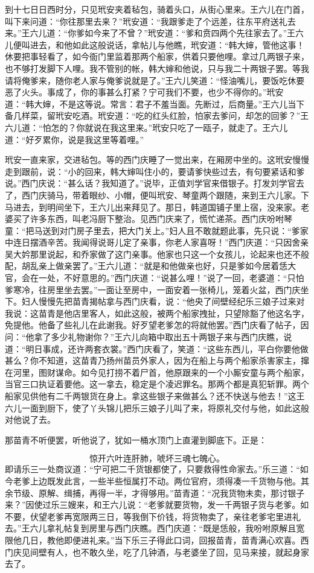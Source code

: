 到十七日日西时分，只见玳安夹着毡包，骑着头口，从街心里来。王六儿在门首，叫下来问道：“你往那里去来？”玳安道：“我跟爹走了个远差，往东平府送礼去来。”王六儿道：“你爹如今来了不曾？”玳安道：“爹和贲四两个先往家去了。”王六儿便叫进去，和他如此这般说话，拿帖儿与他瞧，玳安道：“韩大婶，管他这事！休要把事轻看了，如今衙门里监着那两个船家，供着只要他哩。拿过几两银子来，也不够打发脚下人哩。我不管别的帐，韩大婶和他说，只与我二十两银子罢。等我请将俺爹来，随你老人家与俺爹说就是了。”王六儿笑道：“怪油嘴儿，要饭吃休要恶了火头。事成了，你的事甚么打紧？宁可我们不要，也少不得你的。”玳安道：“韩大婶，不是这等说。常言：君子不羞当面。先断过，后商量。”王六儿当下备几样菜，留玳安吃酒。玳安道：“吃的红头红脸，怕家去爹问，却怎的回爹？”王六儿道：“怕怎的？你就说在我这里来。”玳安只吃了一瓯子，就走了。王六儿道：“好歹累你，说是我这里等着哩。”

玳安一直来家，交进毡包。等的西门庆睡了一觉出来，在厢房中坐的。这玳安慢慢走到跟前，说：“小的回来，韩大婶叫住小的，要请爹快些过去，有句要紧话和爹说。”西门庆说：“甚么话？我知道了。”说毕，正值刘学官来借银子。打发刘学官去了，西门庆骑马，带着眼纱、小帽，便叫玳安、琴童两个跟随，来到王六儿家。下马进去，到明间坐下，王六儿出来拜见了。那日，韩道国铺子里上宿，没来家。老婆买了许多东西，叫老冯厨下整治。见西门庆来了，慌忙递茶。西门庆吩咐琴童：“把马送到对门房子里去，把大门关上。”妇人且不敢就题此事，先只说：“爹家中连日摆酒辛苦。我闻得说哥儿定了亲事，你老人家喜呀！”西门庆道：“只因舍亲吴大妗那里说起，和乔家做了这门亲事。他家也只这一个女孩儿，论起来也还不般配，胡乱亲上做亲罢了。”王六儿道：“就是和他做亲也好，只是爹如今居着恁大官，会在一处，不好意思的。”西门庆道：“说甚么哩！”说了一回，老婆道：“只怕爹寒冷，往房里坐去罢。”一面让至房中，一面安着一张椅儿，笼着火盆，西门庆坐下。妇人慢慢先把苗青揭帖拿与西门庆看，说：“他央了间壁经纪乐三娘子过来对我说：这苗青是他店里客人，如此这般，被两个船家拽扯，只望除豁了他这名字，免提他。他备了些礼儿在此谢我。好歹望老爹怎的将就他罢。”西门庆看了帖子，因问：“他拿了多少礼物谢你？”王六儿向箱中取出五十两银子来与西门庆瞧，说道：“明日事成，还许两套衣裳。”西门庆看了，笑道：“这些东西儿，平白你要他做甚么？你不知道，这苗青乃扬州苗员外家人，因为在船上与两个船家杀害家主，撺在河里，图财谋命。如今见打捞不着尸首，他原跟来的一个小厮安童与两个船家，当官三口执证着要他。这一拿去，稳定是个凌迟罪名。那两个都是真犯斩罪。两个船家见供他有二千两银货在身上。拿这些银子来做甚么？还不快送与他去！”这王六儿一面到厨下，使了丫头锦儿把乐三娘子儿叫了来，将原礼交付与他，如此这般对他说了去。

那苗青不听便罢，听他说了，犹如一桶水顶门上直灌到脚底下。正是：

\[
惊开六叶连肝肺，唬坏三魂七魄心。
\]
即请乐三一处商议道：“宁可把二千货银都使了，只要救得性命家去。”乐三道：“如今老爹上边既发此言，一些半些恒属打不动。两位官府，须得凑一千货物与他。其余节级、原解、缉捕，再得一半，才得够用。”苗青道：“况我货物未卖，那讨银子来？”因使过乐三嫂来，和王六儿说：“老爹就要货物，发一千两银子货与老爹。如不要，伏望老爹再宽限两三日，等我倒下价钱，将货物卖了，亲往老爹宅里进礼去。”王六儿拿礼帖复到房里与西门庆瞧。西门庆道：“既是恁般，我吩咐原解且宽限他几日，教他即便进礼来。”当下乐三子得此口词，回报苗青，苗青满心欢喜。西门庆见间壁有人，也不敢久坐，吃了几钟酒，与老婆坐了回，见马来接，就起身家去了。

